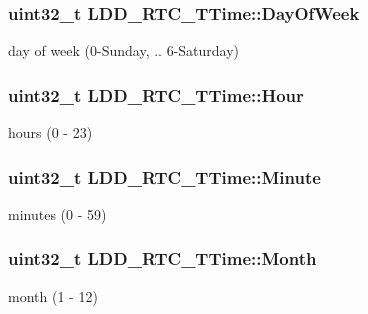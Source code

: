\subsubsection[{\texorpdfstring{Day\+Of\+Week}{DayOfWeek}}]{\setlength{\rightskip}{0pt plus 5cm}uint32\+\_\+t L\+D\+D\+\_\+\+R\+T\+C\+\_\+\+T\+Time\+::\+Day\+Of\+Week}\hypertarget{struct_l_d_d___r_t_c___t_time_a43ba06409c4d35f48d732cb61ff5aed0}{}\label{struct_l_d_d___r_t_c___t_time_a43ba06409c4d35f48d732cb61ff5aed0}
day of week (0-\/\+Sunday, .. 6-\/\+Saturday) 
\subsubsection[{\texorpdfstring{Hour}{Hour}}]{\setlength{\rightskip}{0pt plus 5cm}uint32\+\_\+t L\+D\+D\+\_\+\+R\+T\+C\+\_\+\+T\+Time\+::\+Hour}\hypertarget{struct_l_d_d___r_t_c___t_time_ade2d4bed82069483da14cfe2ede6fef9}{}\label{struct_l_d_d___r_t_c___t_time_ade2d4bed82069483da14cfe2ede6fef9}
hours (0 -\/ 23) 
\subsubsection[{\texorpdfstring{Minute}{Minute}}]{\setlength{\rightskip}{0pt plus 5cm}uint32\+\_\+t L\+D\+D\+\_\+\+R\+T\+C\+\_\+\+T\+Time\+::\+Minute}\hypertarget{struct_l_d_d___r_t_c___t_time_a5cd7a1478dd5dd319fb5837bfbf5459f}{}\label{struct_l_d_d___r_t_c___t_time_a5cd7a1478dd5dd319fb5837bfbf5459f}
minutes (0 -\/ 59) 
\subsubsection[{\texorpdfstring{Month}{Month}}]{\setlength{\rightskip}{0pt plus 5cm}uint32\+\_\+t L\+D\+D\+\_\+\+R\+T\+C\+\_\+\+T\+Time\+::\+Month}\hypertarget{struct_l_d_d___r_t_c___t_time_a2de1da3c8e42665975c2469125b04dfd}{}\label{struct_l_d_d___r_t_c___t_time_a2de1da3c8e42665975c2469125b04dfd}
month (1 -\/ 12) 
